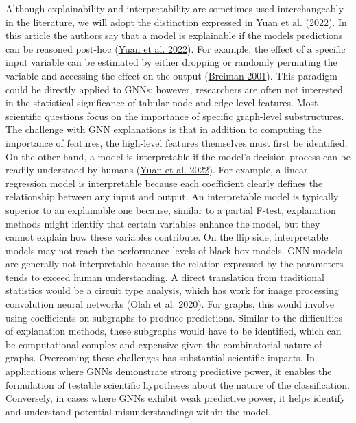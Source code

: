 \documentclass[
  11pt,
  letterpaper,
]{article}
\begin{document}
\quad Although explainability and interpretability are sometimes used
interchangeably in the literature, we will adopt the distinction
expressed in Yuan et al.
(\protect\hyperlink{ref-Yuan_Yu_Gui_Ji_2022}{2022}). In this article the
authors say that a model is explainable if the models predictions can be
reasoned post-hoc (\protect\hyperlink{ref-Yuan_Yu_Gui_Ji_2022}{Yuan et
al. 2022}). For example, the effect of a specific input variable can be
estimated by either dropping or randomly permuting the variable and
accessing the effect on the output
(\protect\hyperlink{ref-Breiman_2001}{Breiman 2001}). This paradigm
could be directly applied to GNNs; however, researchers are often not
interested in the statistical significance of tabular node and
edge-level features. Most scientific questions focus on the importance
of specific graph-level substructures. The challenge with GNN
explanations is that in addition to computing the importance of
features, the high-level features themselves must first be identified.
On the other hand, a model is interpretable if the model's decision
process can be readily understood by humans
(\protect\hyperlink{ref-Yuan_Yu_Gui_Ji_2022}{Yuan et al. 2022}). For
example, a linear regression model is interpretable because each
coefficient clearly defines the relationship between any input and
output. An interpretable model is typically superior to an explainable
one because, similar to a partial F-test, explanation methods might
identify that certain variables enhance the model, but they cannot
explain how these variables contribute. On the flip side, interpretable
models may not reach the performance levels of black-box models. GNN
models are generally not interpretable because the relation expressed by
the parameters tends to exceed human understanding. A direct translation
from traditional statistics would be a circuit type analysis, which has
work for image processing convolution neural networks
(\protect\hyperlink{ref-olah2020zoom}{Olah et al. 2020}). For graphs,
this would involve using coefficients on subgraphs to produce
predictions. Similar to the difficulties of explanation methods, these
subgraphs would have to be identified, which can be computational
complex and expensive given the combinatorial nature of graphs.
Overcoming these challenges has substantial scientific impacts. In
applications where GNNs demonstrate strong predictive power, it enables
the formulation of testable scientific hypotheses about the nature of
the classification. Conversely, in cases where GNNs exhibit weak
predictive power, it helps identify and understand potential
misunderstandings within the model.
\end{document}
